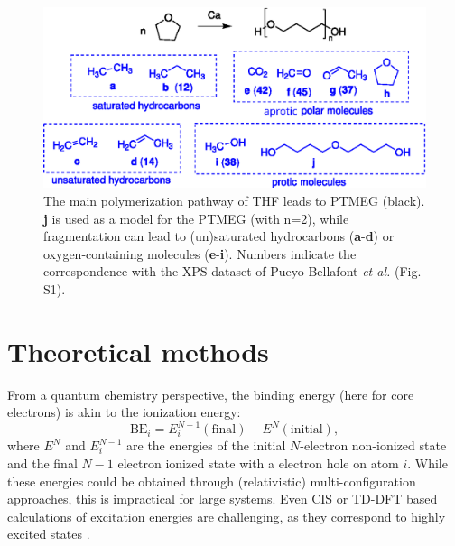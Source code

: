 \documentclass[journal=jpccck,manuscript=article]{achemso}
\begin{document}
\begin{figure}[!h]
	\centering
	\includegraphics[width=\linewidth]{Figure1}
	\caption{The main polymerization pathway of THF leads to PTMEG (black). \textbf{j} is used as a model for the PTMEG (with n=2), while fragmentation can lead to (un)saturated hydrocarbons (\textbf{a}-\textbf{d}) or oxygen-containing molecules (\textbf{e}-\textbf{i}). Numbers indicate the correspondence with the XPS dataset of Pueyo Bellafont \emph{et al.}\cite{pueyobellafontPerformanceTPSSFunctional2016} (Fig. S1).}
	\label{fig:THFdegradation}
\end{figure}

\section{Theoretical methods}\label{sec:theo}

From a quantum chemistry perspective, the binding energy (here for core electrons) is akin to the ionization energy:
\begin{equation}
	\text{BE}_i = E^{N-1}_i(\text{final}) - E^{N}(\text{initial}), \label{eq:dscf}
\end{equation}
where $E^{N}$ and $E^{N-1}_i$ are the energies of the initial $N$-electron non-ionized state and the final $N-1$ electron ionized state with a electron hole on atom $i$. While these energies could be obtained through (relativistic) multi-configuration approaches, this is impractical for large systems. Even CIS or TD-DFT based calculations of excitation energies are challenging, as they correspond to highly excited states \cite{vinesPredictionCoreLevel2018}.
\end{document}
